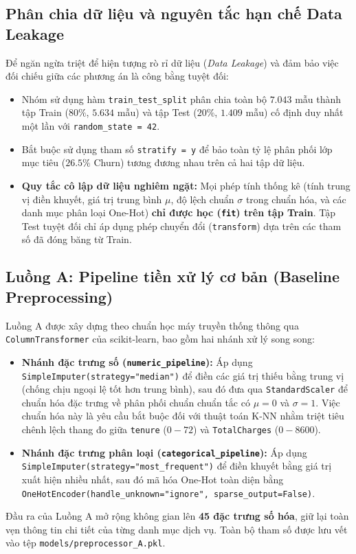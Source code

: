 \documentclass[12pt,a4paper]{article}
\begin{document}
\subsection{Phân chia dữ liệu và nguyên tắc hạn chế Data Leakage}
Để ngăn ngừa triệt để hiện tượng rò rỉ dữ liệu (\textit{Data Leakage}) và đảm bảo việc đối chiếu giữa các phương án là công bằng tuyệt đối:
\begin{itemize}
    \item Nhóm sử dụng hàm \texttt{train\_test\_split} phân chia toàn bộ $7.043$ mẫu thành tập Train ($80\%$, $5.634$ mẫu) và tập Test ($20\%$, $1.409$ mẫu) cố định duy nhất một lần với \texttt{random\_state = 42}.
    \item Bắt buộc sử dụng tham số \texttt{stratify = y} để bảo toàn tỷ lệ phân phối lớp mục tiêu ($26.5\%$ Churn) tương đương nhau trên cả hai tập dữ liệu.
    \item \textbf{Quy tắc cô lập dữ liệu nghiêm ngặt:} Mọi phép tính thống kê (tính trung vị điền khuyết, giá trị trung bình $\mu$, độ lệch chuẩn $\sigma$ trong chuẩn hóa, và các danh mục phân loại One-Hot) \textbf{chỉ được học (\texttt{fit}) trên tập Train}. Tập Test tuyệt đối chỉ áp dụng phép chuyển đổi (\texttt{transform}) dựa trên các tham số đã đóng băng từ Train.
\end{itemize}

\subsection{Luồng A: Pipeline tiền xử lý cơ bản (Baseline Preprocessing)}
Luồng A được xây dựng theo chuẩn học máy truyền thống thông qua \texttt{ColumnTransformer} của scikit-learn, bao gồm hai nhánh xử lý song song:
\begin{itemize}
    \item \textbf{Nhánh đặc trưng số (\texttt{numeric\_pipeline}):} Áp dụng \texttt{SimpleImputer(strategy="median")} để điền các giá trị thiếu bằng trung vị (chống chịu ngoại lệ tốt hơn trung bình), sau đó đưa qua \texttt{StandardScaler} để chuẩn hóa đặc trưng về phân phối chuẩn chuẩn tắc có $\mu = 0$ và $\sigma = 1$. Việc chuẩn hóa này là yêu cầu bắt buộc đối với thuật toán K-NN nhằm triệt tiêu chênh lệch thang đo giữa \texttt{tenure} ($0 - 72$) và \texttt{TotalCharges} ($0 - 8600$).
    \item \textbf{Nhánh đặc trưng phân loại (\texttt{categorical\_pipeline}):} Áp dụng \texttt{SimpleImputer(strategy="most\_frequent")} để điền khuyết bằng giá trị xuất hiện nhiều nhất, sau đó mã hóa One-Hot toàn diện bằng \texttt{OneHotEncoder(handle\_unknown="ignore", sparse\_output=False)}.
\end{itemize}
Đầu ra của Luồng A mở rộng không gian lên \textbf{45 đặc trưng số hóa}, giữ lại toàn vẹn thông tin chi tiết của từng danh mục dịch vụ. Toàn bộ tham số được lưu vết vào tệp \texttt{models/preprocessor\_A.pkl}.
\end{document}
